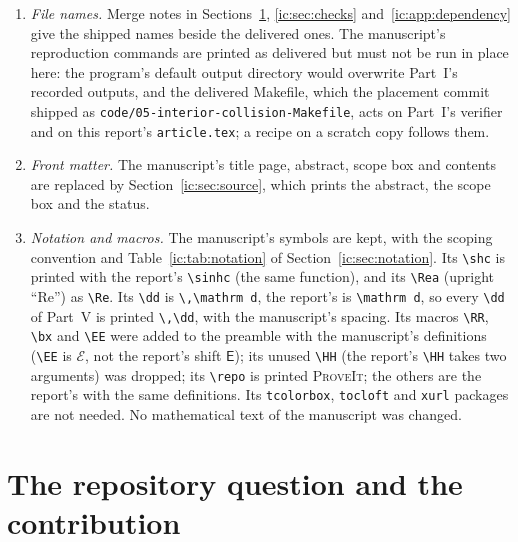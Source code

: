 \documentclass[11pt,a4paper]{article}
\numberwithin{equation}{section}
\theoremstyle{definition}
\theoremstyle{remark}
\newcommand{\HH}[2]{H_{#1}^{(#2)}}
\newcommand{\dd}{\mathrm d}
\newcommand{\E}{\mathsf E}
\newcommand{\sinhc}{\operatorname{sinhc}}
\newcommand{\RR}{\mathbb R}
\newcommand{\bx}{\boldsymbol x}
\newcommand{\EE}{\mathcal E}
\begin{document}
\begin{enumerate}[leftmargin=*,itemsep=2pt]
 above)'' after the Part~IV title, ``its Section~\ref{tec:x:q1}'' for ``its
 Section~13.1'', ``(Part~IV, Theorem~\ref{tec:thm:main})'' and ``(Part~II,
 Section~\ref{ic:x:rcq5})''; ``Part~II, Section~24.4'' is printed as a
 cross-reference to Section~\ref{tec:x:rcq4}, with the same number.  The
 manuscript's bibliography entry for the pinned report called it
 ``Parts~I--III'' although the manuscript also relies on Part~IV through the
 standalone manuscript; the replacement makes this moot.
\item \emph{File names.}  Merge notes in Sections~\ref{ic:sec:context},
 \ref{ic:sec:checks} and~\ref{ic:app:dependency} give the shipped names
 beside the delivered ones.  The manuscript's reproduction commands are
 printed as delivered but must not be run in place here: the program's
 default output directory would overwrite Part~I's recorded outputs, and the
 delivered Makefile, which the placement commit shipped as
 \nolinkurl{code/05-interior-collision-Makefile}, acts on Part~I's verifier
 and on this report's \nolinkurl{article.tex}; a recipe on a scratch copy
 follows them.
\item \emph{Front matter.}  The manuscript's title page, abstract, scope box
 and contents are replaced by Section~\ref{ic:sec:source}, which prints the
 abstract, the scope box and the status.
\item \emph{Notation and macros.}  The manuscript's symbols are kept, with
 the scoping convention and Table~\ref{ic:tab:notation} of
 Section~\ref{ic:sec:notation}.  Its \verb|\shc| is printed with the
 report's \verb|\sinhc| (the same function), and its \verb|\Rea|
 (upright ``Re'') as \verb|\Re|.  Its \verb|\dd| is
 \verb|\,\mathrm d|, the report's is \verb|\mathrm d|, so every \verb|\dd|
 of Part~V is printed \verb|\,\dd|, with the manuscript's spacing.  Its
 macros \verb|\RR|, \verb|\bx| and \verb|\EE| were added to the preamble
 with the manuscript's definitions (\verb|\EE| is $\EE$, not the report's
 shift $\E$); its unused \verb|\HH| (the report's \verb|\HH| takes two
 arguments) was dropped; its \verb|\repo| is printed \textsc{ProveIt}; the
 others are the report's with the same definitions.  Its
 \texttt{tcolorbox}, \texttt{tocloft} and \texttt{xurl} packages are not
 needed.  No mathematical text of the manuscript was changed.
\end{enumerate}

\section{The repository question and the contribution}\label{ic:sec:context}
\end{document}

